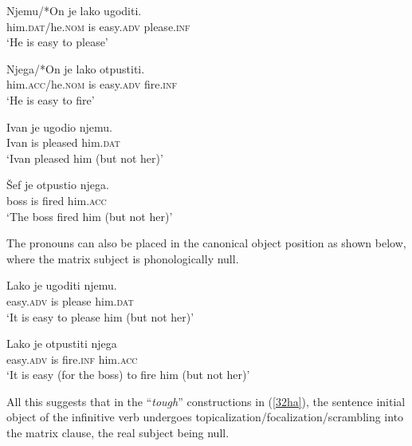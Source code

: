 \documentclass[output=paper,colorlinks,citecolor=brown,
]{langscibook}
\begin{document}
\begin{exe}
\ex \label{32ha}
\begin{xlist}
\ex \label{32aha}
\gll Njemu/*On je lako ugoditi.\\
him.\textsc{dat}/he.\textsc{nom} is easy.\textsc{adv} please.\textsc{inf}\\
\glt `He is easy to please’

\ex \label{32bha}
\gll Njega/*On je lako otpustiti.\\
him.\textsc{acc}/he.\textsc{nom} is easy.\textsc{adv} fire.\textsc{inf}\\
\glt ‘He is easy to fire’
\end{xlist}

\ex \label{33ha}
\begin{xlist}
\ex \label{33aha}
\gll Ivan je ugodio  njemu.\\
Ivan is pleased him.\textsc{dat}\\
\glt ‘Ivan pleased him (but not her)’

\ex \label{32bha}
\gll Šef je otpustio njega.\\
boss is fired him.\textsc{acc}\\
\glt `The boss fired him (but not her)’
\end{xlist}
\end{exe}

The pronouns can also be placed in the canonical object position as shown below, where the matrix subject is phonologically null. 

\begin{exe}
\ex \label{34ha}
\begin{xlist}
\ex \label{34aha}
\gll Lako je ugoditi njemu.\\
easy.\textsc{adv} is please him.\textsc{dat}\\
\glt ‘It is easy to please him (but not her)’

\ex \label{34bha}
\gll Lako je otpustiti njega\\
easy.\textsc{adv} is fire.\textsc{inf} him.\textsc{acc}\\
\glt ‘It is easy (for the boss) to fire him (but not her)’
\end{xlist}
\end{exe}

All this suggests that in the “\textit{tough}” constructions in (\ref{32ha}), the sentence initial object of the infinitive verb undergoes topicalization/focalization/scrambling into the matrix clause, the real subject being null.  
\end{document}
